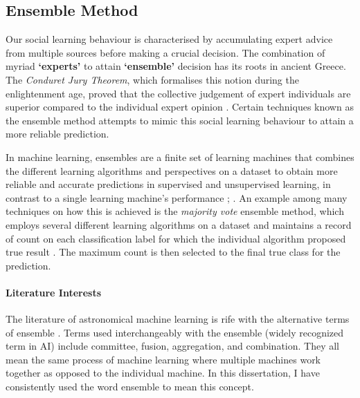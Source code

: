 \subsection{Ensemble Method}
Our social learning behaviour is characterised by accumulating expert advice from multiple sources before making a crucial decision. The combination of myriad \textbf{`experts'} to attain  \textbf{`ensemble'} decision has its roots in ancient Greece. The \emph{Conduret Jury Theorem}, which formalises this notion during the enlightenment age, proved that the collective judgement of expert individuals are superior compared to the individual expert opinion \parencite{de_condorcet_essai_2014}. Certain techniques known as the ensemble method attempts to mimic this social learning behaviour to attain a more reliable prediction.

In machine learning, ensembles are a finite set of learning machines that combines the different learning algorithms and perspectives on a dataset to obtain more reliable and accurate predictions in supervised and unsupervised learning, in contrast to a single learning machine's performance \parencite{dietterich_experimental_2000}; \parencite{kuncheva_combining_2014}. An example among many techniques on how this is achieved is the \emph{majority vote} ensemble method, which employs several different learning algorithms on a dataset and maintains a record of count on each classification label for which the individual algorithm proposed true result \parencite{cooper_when_1993}. The maximum count is then selected to the final true class for the prediction.

\paragraph{Literature Interests}
The literature of astronomical machine learning is rife with the alternative terms of ensemble \parencites{drucker_boosting_1994, filippi_multi-layer_1994, sung-bae_cho_multiple_1995, lam_optimal_1995, kittler_combining_1998, bunke_multiple_2002, banfield_comparison_2007}. Terms used interchangeably with the ensemble (widely recognized term in AI) include committee, fusion, aggregation, and combination. They all mean the same process of machine learning where multiple machines work together as opposed to the individual machine. In this dissertation, I have consistently used the word ensemble to mean this concept.

